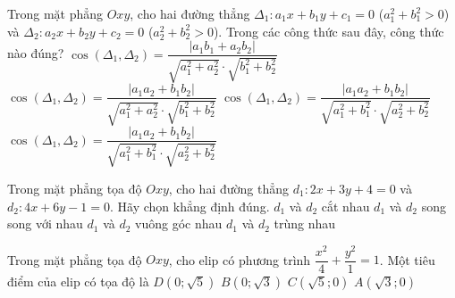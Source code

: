 \begin{ex}%
	Trong mặt phẳng $Oxy$, cho hai đường thẳng $\Delta_1\colon a_1x+b_1y+c_1=0$ ($a_1^2+b_1^2>0$) và $\Delta_2\colon a_2x+b_2y+c_2=0$ ($a_2^2+b_2^2>0$). Trong các công thức sau đây, công thức nào đúng?
	\choice
	{$\cos\left(\Delta_1,\Delta_2\right)=\dfrac{\left|a_1b_1+a_2b_2\right|}{\sqrt{a_1^2+a_2^2}\cdot\sqrt{b_1^2+b_2^2}}$}
	{$\cos\left(\Delta_1,\Delta_2\right)=\dfrac{\left|a_1a_2+b_1b_2\right|}{\sqrt{a_1^2+a_2^2}\cdot\sqrt{b_1^2+b_2^2}}$}
	{\True $\cos\left(\Delta_1,\Delta_2\right)=\dfrac{\left|a_1a_2+b_1b_2\right|}{\sqrt{a_1^2+b_1^2}\cdot\sqrt{a_2^2+b_2^2}}$}
	{$\cos\left(\Delta_1,\Delta_2\right)=\dfrac{\left|a_1a_2+b_1b_2\right|}{\sqrt{a_1^2+b_1^2}\cdot\sqrt{a_2^2+b_2^2}}$}
\end{ex}

\begin{ex}%
	Trong mặt phẳng tọa độ $Oxy$, cho hai đường thẳng $d_1\colon 2x+3y+4=0$ và $d_2\colon 4x+6y-1=0$. Hãy chọn khẳng định đúng.
	\choice
	{$d_1$ và $d_2$ cắt nhau}
	{\True $d_1$ và $d_2$ song song với nhau}
	{$d_1$ và $d_2$ vuông góc nhau}
	{$d_1$ và $d_2$ trùng nhau}
\end{ex}

\begin{ex}%
	Trong mặt phẳng tọa độ $Oxy$, cho elip có phương trình  $\dfrac{x^2}{4}+\dfrac{y^2}{1}=1$. Một tiêu điểm của elip có tọa độ là
	\choice
	{$D\left(0;\sqrt{5}\right)$}
	{$B\left(0;\sqrt{3} \right)$}
	{$C\left(\sqrt{5};0\right)$}
	{\True $A\left(\sqrt{3};0\right)$}
\end{ex}

